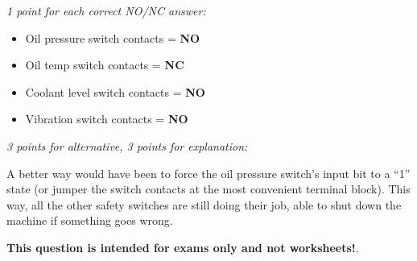 





{\it 1 point for each correct NO/NC answer:}

\begin{itemize}
\item{} Oil pressure switch contacts = {\bf NO}
\item{} Oil temp switch contacts = {\bf NC}
\item{} Coolant level switch contacts = {\bf NO}
\item{} Vibration switch contacts = {\bf NO}
\end{itemize}

{\it 3 points for alternative, 3 points for explanation:}

A better way would have been to force the oil pressure switch's input bit to a ``1'' state (or jumper the switch contacts at the most convenient terminal block).  This way, all the other safety switches are still doing their job, able to shut down the machine if something goes wrong.







{\bf This question is intended for exams only and not worksheets!}.


